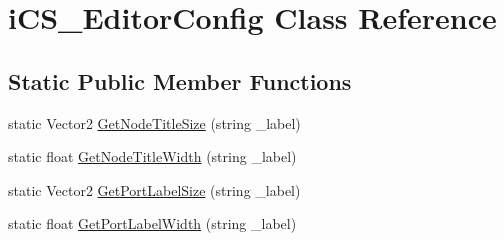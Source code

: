\hypertarget{classi_c_s___editor_config}{\section{i\+C\+S\+\_\+\+Editor\+Config Class Reference}
\label{classi_c_s___editor_config}
}
\subsection*{Static Public Member Functions}
\begin{DoxyCompactItemize}
\item 
static Vector2 \hyperlink{classi_c_s___editor_config_ac715606349a859cb91349f01e5359f79}{Get\+Node\+Title\+Size} (string \+\_\+label)
\item 
static float \hyperlink{classi_c_s___editor_config_acc43e6f79f22fd6e9504720e87b6ec7a}{Get\+Node\+Title\+Width} (string \+\_\+label)
\item 
static Vector2 \hyperlink{classi_c_s___editor_config_ab1c29b9a7cdc5dd70c7a23977d025abc}{Get\+Port\+Label\+Size} (string \+\_\+label)
\item 
static float \hyperlink{classi_c_s___editor_config_aa1233d831737e1c41a1d37e47a85f5ef}{Get\+Port\+Label\+Width} (string \+\_\+label)
\end{DoxyCompactItemize}

